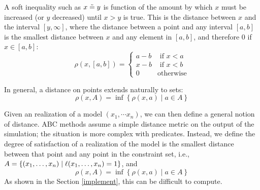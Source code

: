 
A soft inequality such as $x \mathrel{\tilde{=}} y$ is function of the amount by which $x$ must be increased (or $y$ decreased) until $x > y$ is true.
This is the distance between $x$ and the interval $[y, \infty]$, where the distance between a point and any interval $[a, b]$ is the smallest distance between $x$ and any element in $[a, b]$, and therefore 0 if $x \in [a, b]$:
\begin{equation}
\rho(x, [a, b]) =
\begin{cases}
  a - b & \text{ if } x < a\\
  x - b & \text{ if } x < b\\
  0              & \text{otherwise}
\end{cases}
\end{equation}

In general, a distance on points extends naturally to sets:
\begin{equation}
\rho(x, A) = \inf \left\{\rho(x, a) \mid a \in A\right\}
\end{equation}

Given an realization of a model $(x_1, \cdots x_n)$, we can then define a general notion of distance.
ABC methods assume a simple distance metric on the output of the simulation; the situation is more complex with predicates.
Instead, we define the degree of satisfaction of a realization of the model is the smallest distance between that point and any point in the constraint set, i.e., $A = \{(x_1, \dots, x_n) \mid \operatorname{\ell}(x_1, \dots, x_n) = 1\}$, and
\begin{equation}
\rho(x, A) = \inf \left\{\rho(x, a) \mid a \in A\right\}
\end{equation}
As shown in the Section \ref{implement}, this can be difficult to compute.



